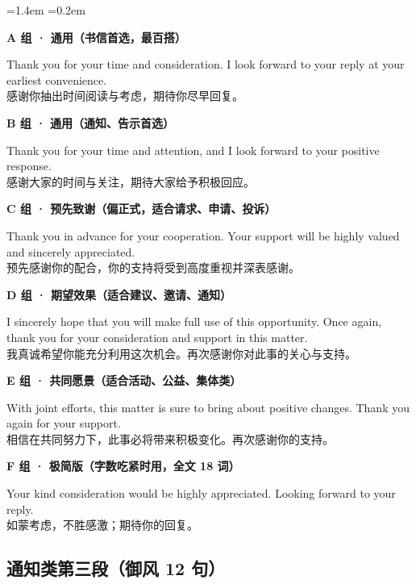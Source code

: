 \documentclass[11pt,a4paper]{ctexart}
\newenvironment{eg}{%
  \par\addvspace{4pt}%
  \begin{list}{}{\leftmargin=1.4em \rightmargin=0.2em \listparindent=0pt
    \itemindent=0pt \topsep=0pt \parsep=2pt \itemsep=2pt \partopsep=0pt}%
  \item\relax
}{%
  \end{list}\addvspace{5pt}%
}
\begin{document}
\begin{eg}
\textbf{A 组 · 通用（书信首选，最百搭）}\par
Thank you for your time and consideration. I look forward to your reply at your earliest convenience.\\
感谢你抽出时间阅读与考虑，期待你尽早回复。\par

\textbf{B 组 · 通用（通知、告示首选）}\par
Thank you for your time and attention, and I look forward to your positive response.\\
感谢大家的时间与关注，期待大家给予积极回应。\par

\textbf{C 组 · 预先致谢（偏正式，适合请求、申请、投诉）}\par
Thank you in advance for your cooperation. Your support will be highly valued and sincerely appreciated.\\
预先感谢你的配合，你的支持将受到高度重视并深表感谢。\par

\textbf{D 组 · 期望效果（适合建议、邀请、通知）}\par
I sincerely hope that you will make full use of this opportunity. Once again, thank you for your consideration and support in this matter.\\
我真诚希望你能充分利用这次机会。再次感谢你对此事的关心与支持。\par

\textbf{E 组 · 共同愿景（适合活动、公益、集体类）}\par
With joint efforts, this matter is sure to bring about positive changes. Thank you again for your support.\\
相信在共同努力下，此事必将带来积极变化。再次感谢你的支持。\par

\textbf{F 组 · 极简版（字数吃紧时用，全文 18 词）}\par
Your kind consideration would be highly appreciated. Looking forward to your reply.\\
如蒙考虑，不胜感激；期待你的回复。
\end{eg}


\subsection{通知类第三段（御风 12 句）}
\end{document}
